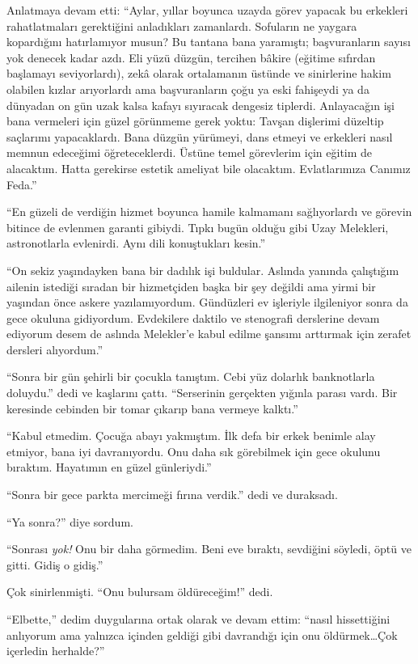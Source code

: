 Anlatmaya devam etti: ``Aylar, yıllar boyunca uzayda görev yapacak bu erkekleri
rahatlatmaları gerektiğini anladıkları zamanlardı. Sofuların ne yaygara
kopardığını hatırlamıyor musun? Bu tantana bana yaramıştı; başvuranların sayısı
yok denecek kadar azdı. Eli yüzü düzgün, tercihen bâkire (eğitime sıfırdan
başlamayı seviyorlardı), zekâ olarak ortalamanın üstünde ve sinirlerine hakim
olabilen kızlar arıyorlardı ama başvuranların çoğu ya eski fahişeydi ya da
dünyadan on gün uzak kalsa kafayı sıyıracak dengesiz tiplerdi. Anlayacağın işi
bana vermeleri için güzel görünmeme gerek yoktu: Tavşan dişlerimi düzeltip
saçlarımı yapacaklardı. Bana düzgün yürümeyi, dans etmeyi ve erkekleri nasıl
memnun edeceğimi öğreteceklerdi. Üstüne temel görevlerim için eğitim de
alacaktım. Hatta gerekirse estetik ameliyat bile olacaktım. Evlatlarımıza
Canımız Feda.''

``En güzeli de verdiğin hizmet boyunca hamile kalmamanı sağlıyorlardı ve görevin
bitince de evlenmen garanti gibiydi. Tıpkı bugün olduğu gibi Uzay Melekleri,
astronotlarla evlenirdi. Aynı dili konuştukları kesin.''

``On sekiz yaşındayken bana bir dadılık işi buldular. Aslında yanında çalıştığım
ailenin istediği sıradan bir hizmetçiden başka bir şey değildi ama yirmi bir
yaşından önce askere yazılamıyordum. Gündüzleri ev işleriyle ilgileniyor sonra
da gece okuluna gidiyordum. Evdekilere daktilo ve stenografi derslerine devam
ediyorum desem de aslında Melekler'e kabul edilme şansımı arttırmak için zerafet
dersleri alıyordum.''

``Sonra bir gün şehirli bir çocukla tanıştım. Cebi yüz dolarlık banknotlarla
doluydu.'' dedi ve kaşlarını çattı. ``Serserinin gerçekten yığınla parası vardı.
Bir keresinde cebinden bir tomar çıkarıp bana vermeye kalktı.''

``Kabul etmedim. Çocuğa abayı yakmıştım. İlk defa bir erkek benimle alay
etmiyor, bana iyi davranıyordu. Onu daha sık görebilmek için gece okulunu
bıraktım. Hayatımın en güzel günleriydi.''

``Sonra bir gece parkta mercimeği fırına verdik.'' dedi ve duraksadı.

``Ya sonra?'' diye sordum.

``Sonrası \emph{yok!} Onu bir daha görmedim. Beni eve bıraktı, sevdiğini söyledi, öptü
ve gitti. Gidiş o gidiş.''

Çok sinirlenmişti. ``Onu bulursam öldüreceğim!'' dedi.

``Elbette,'' dedim duygularına ortak olarak ve devam ettim: ``nasıl hissettiğini
anlıyorum ama yalnızca içinden geldiği gibi davrandığı için onu öldürmek\dots Çok
içerledin herhalde?''

